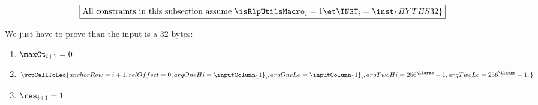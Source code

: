 \[
    \boxed{\text{All constraints in this subsection assume } \isRlpUtilsMacro_{i} = 1 \et \INST_{i} = \inst{BYTES32} }
\]

We just have to prove than the input is a 32-bytes:

\begin{enumerate}
    \item $\maxCt_{i+1} = 0$
    \item \[
            \wcpCallToLeq {
                anchorRow = i +1                   ,
                relOffset = 0                      ,
                argOneHi  = \inputColumn{1}_{i}    ,
                argOneLo  = \inputColumn{1}_{i}    ,
                argTwoHi  = 256^{\llarge} -1       ,
                argTwoLo  = 256^{\llarge} -1       ,
            }
        \]
    \item $\res_{i+1} =1$
\end{enumerate}
